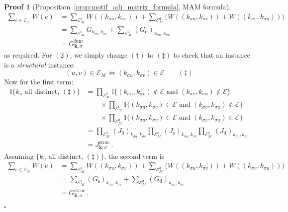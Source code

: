 \documentclass[12pt,draft]{ociamthesis}
\theoremstyle{plain}
\theoremstyle{definition}
\newtheorem{prf}{Proof}[chapter]
\theoremstyle{remark}
\newcommand\bb[1]{\mathbb{#1}}
\newcommand\ca[1]{\mathcal{#1}}
\begin{document}
\begin{prf}[Proposition~\ref{prop:motif_adj_matrix_formula}, MAM formula]
%
\begin{align*}
%
\sum_{e \in \ca{E_H}} W(e)
&= \sum_{\ca{E}_\ca{M}^\mathrm{s}} W((k_{\sigma u},k_{\sigma v}))
+ \sum_{\ca{E}_\ca{M}^\mathrm{d}} \big( W((k_{\sigma u},k_{\sigma v})) +
W((k_{\sigma v},k_{\sigma u})) \big) \\
%
&= \sum_{\ca{E}_\ca{M}^\mathrm{s}} G_{k_{\sigma u},k_{\sigma v}}
+ \sum_{\ca{E}_\ca{M}^\mathrm{d}} (G_\mathrm{d})_{k_{\sigma u},k_{\sigma
v}} \\
%
&= G^\mathrm{func}_{\mathbf{k},\sigma}
\end{align*}
%
as required. For $(2)$, we simply change $(\dagger)$ to $(\ddagger)$ to check
that an instance is a \emph{structural} instance:
%
$$ (u,v) \in \ca{E_M} \iff (k_{\sigma u}, k_{\sigma v}) \in \ca{E} \qquad
(\ddagger) $$
%
Now for the first term:
%
\begin{align*}
%
\bb{I} \big\{ k_u \textrm{ all distinct}, \, (\ddagger) \big\}
&= \prod_{\ca{E}_\ca{M}^0} \bb{I} \{(k_{\sigma u}, k_{\sigma v}) \notin
\ca{E} \textrm{ and } (k_{\sigma v}, k_{\sigma u}) \notin \ca{E}\} \\
& \qquad \times \prod_{\ca{E}_\ca{M}^\mathrm{s}} \bb{I} \{(k_{\sigma u},
k_{\sigma v}) \in \ca{E} \textrm{ and } (k_{\sigma v}, k_{\sigma u})
\notin
\ca{E}\} \\
& \qquad \times \prod_{\ca{E}_\ca{M}^\mathrm{d}} \bb{I} \{(k_{\sigma u},
k_{\sigma v}) \in \ca{E} \textrm{ and } (k_{\sigma v}, k_{\sigma u}) \in
\ca{E}\} \\
%
&= \prod_{\ca{E}_\ca{M}^0} (J_\mathrm{0})_{k_{\sigma u},k_{\sigma v}}
\prod_{\ca{E}_\ca{M}^\mathrm{s}} (J_\mathrm{s})_{k_{\sigma u},k_{\sigma v}}
\prod_{\ca{E}_\ca{M}^\mathrm{d}} (J_\mathrm{d})_{k_{\sigma u},k_{\sigma v}}
\\
%
&= J^\mathrm{struc}_{\mathbf{k},\sigma}\,.
%
\end{align*}
%
Assuming $\big\{ k_u \textrm{ all distinct}, \, (\ddagger) \big\}$, the
second term is
%
\begin{align*}
%
\sum_{e \in \ca{E_H}} W(e)
&= \sum_{\ca{E}_\ca{M}^\mathrm{s}} W((k_{\sigma u},k_{\sigma v}))
+ \sum_{\ca{E}_\ca{M}^\mathrm{d}} \big( W((k_{\sigma u},k_{\sigma v})) +
W((k_{\sigma v},k_{\sigma u})) \big) \\
%
&= \sum_{\ca{E}_\ca{M}^\mathrm{s}} (G_\mathrm{s})_{k_{\sigma u},k_{\sigma
v}}
+ \sum_{\ca{E}_\ca{M}^\mathrm{d}} (G_\mathrm{d})_{k_{\sigma u},k_{\sigma
v}} \\
%
&= G^\mathrm{struc}_{\mathbf{k},\sigma}\,.
\end{align*}

\hfill $\square$
\end{prf}
\end{document}
